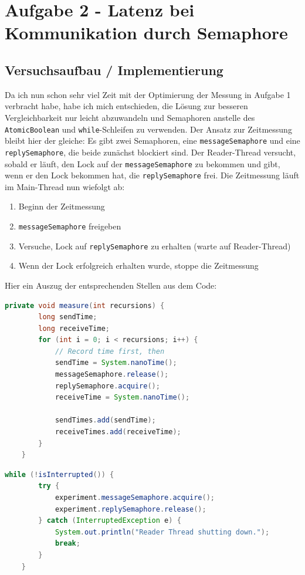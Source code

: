 \documentclass[12pt]{article}
\begin{document}
\section{Aufgabe 2 - Latenz bei Kommunikation durch Semaphore}
\subsection{Versuchsaufbau / Implementierung}

Da ich nun schon sehr viel Zeit mit der Optimierung der Messung in Aufgabe 1 verbracht habe, habe ich mich entschieden, die Lösung zur besseren Vergleichbarkeit nur leicht abzuwandeln und Semaphoren anstelle des \texttt{AtomicBoolean} und \texttt{while}-Schleifen zu verwenden.
Der Ansatz zur Zeitmessung bleibt hier der gleiche: 
Es gibt zwei Semaphoren, eine \texttt{messageSemaphore} und eine \texttt{replySemaphore}, die beide zunächst blockiert sind.
Der Reader-Thread versucht, sobald er läuft, den Lock auf der \texttt{messageSemaphore} zu bekommen und gibt, wenn er den Lock bekommen hat, die \texttt{replySemaphore} frei.
Die Zeitmessung läuft im Main-Thread nun wiefolgt ab:
\begin{enumerate}
	\item Beginn der Zeitmessung
	\item \texttt{messageSemaphore} freigeben
	\item Versuche, Lock auf \texttt{replySemaphore} zu erhalten (warte auf Reader-Thread)
	\item Wenn der Lock erfolgreich erhalten wurde, stoppe die Zeitmessung
\end{enumerate}

Hier ein Auszug der entsprechenden Stellen aus dem Code:

\begin{lstlisting}[language=java,caption={Semaphores: Latenzmessung im Main Thread}]
	private void measure(int recursions) {
		long sendTime;
		long receiveTime;
		for (int i = 0; i < recursions; i++) {
			// Record time first, then
			sendTime = System.nanoTime();
			messageSemaphore.release();
			replySemaphore.acquire();
			receiveTime = System.nanoTime();
			
			sendTimes.add(sendTime);
			receiveTimes.add(receiveTime);
		}
	}
\end{lstlisting}

\begin{lstlisting}[language=java,caption={Freigeben der replySemaphore im Reader Thread}]
	while (!isInterrupted()) {
		try {
			experiment.messageSemaphore.acquire();
			experiment.replySemaphore.release();
		} catch (InterruptedException e) {
			System.out.println("Reader Thread shutting down.");
			break;
		}
	}
\end{lstlisting}
\end{document}

